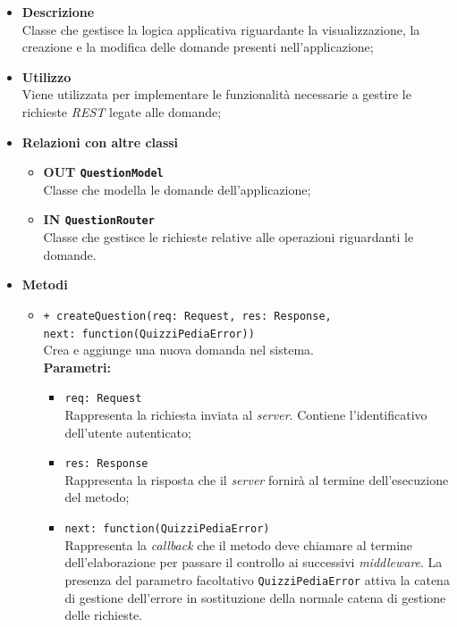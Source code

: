 	\begin{itemize}
		\item \textbf{Descrizione} \\
		Classe che gestisce la logica applicativa riguardante la visualizzazione, la creazione e la modifica delle domande presenti nell'applicazione;
		\item \textbf{Utilizzo} \\
		Viene utilizzata per implementare le funzionalità necessarie a gestire le richieste \textit{REST} legate alle domande;
		\item \textbf{Relazioni con altre classi}
			\begin{itemize}
				\item \textbf{OUT \texttt{QuestionModel}} \\
				Classe che modella le domande dell'applicazione;
				\item \textbf{IN \texttt{QuestionRouter}} \\
				Classe che gestisce le richieste relative alle operazioni riguardanti le domande.
			\end{itemize}
		\item \textbf{Metodi}
			\begin{itemize}
				\item \texttt{+ createQuestion(req: Request, res: Response,\\ next: function(QuizziPediaError))} \\
				Crea e aggiunge una nuova domanda nel sistema. \\
				\textbf{Parametri:}
				\begin{itemize}
					\item \texttt{req: Request} \\
					Rappresenta la richiesta inviata al \textit{server}. Contiene l'identificativo dell'utente autenticato;
					\item \texttt{res: Response} \\
					Rappresenta la risposta che il \textit{server} fornirà al termine dell'esecuzione del metodo;
					\item \texttt{next: function(QuizziPediaError)} \\
					Rappresenta la \textit{callback} che il metodo deve chiamare al termine dell'elaborazione per passare il controllo ai successivi \textit{middleware}. La presenza del parametro facoltativo \texttt{QuizziPediaError} attiva la catena di gestione dell'errore in sostituzione della normale catena di gestione delle richieste.

\end{itemize}
\end{itemize}
\end{itemize}

